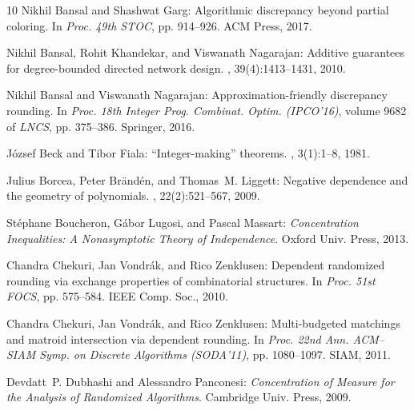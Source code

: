 \documentclass[11pt]{article}
\theoremstyle{definition}
\begin{document}
\begin{thebibliography}{10}
{\sc Nikhil Bansal and Shashwat Garg}: Algorithmic discrepancy beyond partial
  coloring.
\newblock In {\em Proc. 49th STOC}, pp. 914--926. ACM Press, 2017.
\newblock [\epfmtdoi{10.1145/3055399.3055490}]

{\sc Nikhil Bansal, Rohit Khandekar, and Viswanath Nagarajan}: Additive
  guarantees for degree-bounded directed network design.
, 39(4):1413--1431, 2010.
\newblock [\epfmtdoi{10.1137/080734340}]

{\sc Nikhil Bansal and Viswanath Nagarajan}: Approximation-friendly discrepancy
  rounding.
\newblock In {\em Proc. 18th Integer Prog. Combinat. Optim. (IPCO'16)}, volume
  9682 of {\em LNCS}, pp. 375--386. Springer, 2016.
\newblock [\epfmtdoi{10.1007/978-3-319-33461-5\_31}]

{\sc J{\'{o}}zsef Beck and Tibor Fiala}: ``{I}nteger-making'' theorems.
, 3(1):1--8, 1981.
\newblock [\epfmtdoi{10.1016/0166-218X(81)90022-6}]

{\sc Julius Borcea, Peter Br\"{a}nd\'{e}n, and Thomas~M. Liggett}: Negative
  dependence and the geometry of polynomials.
, 22(2):521--567, 2009.
\newblock [\epfmtdoi{10.1090/S0894-0347-08-00618-8}]

{\sc St\'{e}phane Boucheron, G\'{a}bor Lugosi, and Pascal Massart}: {\em
  Concentration Inequalities: A Nonasymptotic Theory of Independence}.
\newblock Oxford Univ. Press, 2013.

{\sc Chandra Chekuri, Jan Vondr\'ak, and Rico Zenklusen}: Dependent randomized
  rounding via exchange properties of combinatorial structures.
\newblock In {\em Proc. 51st FOCS}, pp. 575--584. IEEE Comp. Soc., 2010.

{\sc Chandra Chekuri, Jan Vondr\'ak, and Rico Zenklusen}: Multi-budgeted
  matchings and matroid intersection via dependent rounding.
\newblock In {\em Proc. 22nd Ann. ACM--SIAM Symp. on Discrete Algorithms
  (SODA'11)}, pp. 1080--1097. SIAM, 2011.
\newblock [\epfmtdoi{10.1137/1.9781611973082.82}]

{\sc Devdatt~P. Dubhashi and Alessandro Panconesi}: {\em Concentration of
  Measure for the Analysis of Randomized Algorithms}.
\newblock Cambridge Univ. Press, 2009.


\end{thebibliography}
\end{document}
